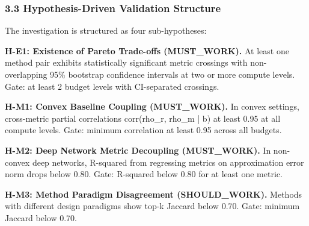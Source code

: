 \subsubsection{3.3 Hypothesis-Driven Validation Structure}

The investigation is structured as four sub-hypotheses:

\textbf{H-E1: Existence of Pareto Trade-offs (MUST\_WORK).} At least one method pair exhibits statistically significant metric crossings with non-overlapping 95\% bootstrap confidence intervals at two or more compute levels. Gate: at least 2 budget levels with CI-separated crossings.

\textbf{H-M1: Convex Baseline Coupling (MUST\_WORK).} In convex settings, cross-metric partial correlations corr(rho\_r, rho\_m | b) at least 0.95 at all compute levels. Gate: minimum correlation at least 0.95 across all budgets.

\textbf{H-M2: Deep Network Metric Decoupling (MUST\_WORK).} In non-convex deep networks, R-squared from regressing metrics on approximation error norm drops below 0.80. Gate: R-squared below 0.80 for at least one metric.

\textbf{H-M3: Method Paradigm Disagreement (SHOULD\_WORK).} Methods with different design paradigms show top-k Jaccard below 0.70. Gate: minimum Jaccard below 0.70.
